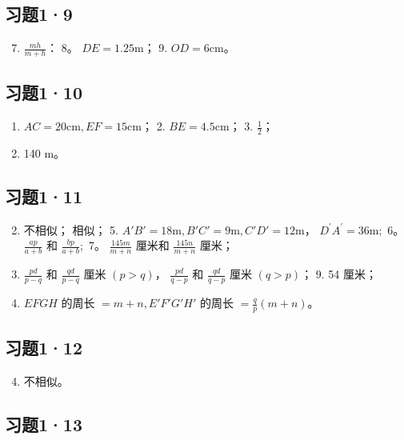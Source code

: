 \subsection{习题1·9}

\begin{enumerate}
\setcounter{enumi}{6}
\item
  \(\frac{mh}{m + h}\)： 8。 \(DE = 1.25\mathrm{m}\)； 9.
  \(OD = 6\mathrm{cm}\)。
\end{enumerate}

\subsection{习题1·10}

\begin{enumerate}
\item
  \(AC = 20\mathrm{cm}, EF = 15\mathrm{cm}\)； 2.
  \(BE = 4.5\mathrm{cm}\)； 3. \(\frac{1}{2}\)；
\item
  140 m。
\end{enumerate}

\subsection{习题1·11}

\begin{enumerate}
\setcounter{enumi}{1}
\item
  不相似； 相似； 5.
  \(A'B' = 18\mathrm{m}, B'C' = 9\mathrm{m}, C'D' = 12\mathrm{m}\)，
  \(D^{\prime}A^{\prime} = 36\mathrm{m};\) 6。 \(\frac{ap}{a + b}\) 和
  \(\frac{bp}{a + b};\) 7。 \(\frac{145m}{m + n}\) 厘米和
  \(\frac{145n}{m + n}\) 厘米；
\item
  \(\frac{pd}{p - q}\) 和 \(\frac{qd}{p - q}\) 厘米 \((p > q)\)，
  \(\frac{pd}{q - p}\) 和 \(\frac{qd}{q - p}\) 厘米 \((q > p)\)； 9. 54
  厘米；
\item
  \(EFGH\) 的周长 \(= m + n, E'F'G'H'\) 的周长
  \(= \frac{q}{p} (m + n)\)。
\end{enumerate}

\subsection{习题1·12}

\begin{enumerate}
\setcounter{enumi}{3}
\item
  不相似。
\end{enumerate}

\subsection{习题1·13}

